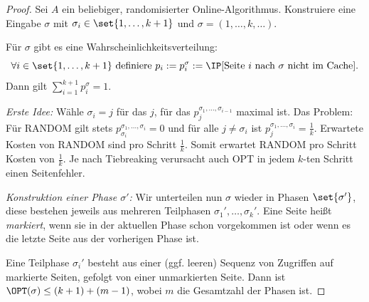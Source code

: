 \documentclass[language=ngerman,algolist]{TemplateLecture}
\begin{document}
\begin{proof}
    Sei $A$ ein beliebiger, randomisierter Online-Algorithmus. Konstruiere eine Eingabe $\sigma$ mit $\sigma_i \in \set{1, \ldots, k+1}$ und $\sigma = (1, \ldots, k, \ldots)$.

    Für $\sigma$ gibt es eine Wahrscheinlichkeitsverteilung:
    \begin{equation*}
        \forall i \in \set{1,\ldots,k+1} \text{ definiere } p_i := p_i^\sigma := \IP[\text{Seite $i$ nach $\sigma$ nicht im Cache}].
    \end{equation*}
    Dann gilt $\sum_{i = 1}^{k + 1} p_i^\sigma = 1$.

    \emph{Erste Idee:} Wähle $\sigma_i = j$ für das $j$, für das $p_j^{\sigma_1, \ldots, \sigma_{i-1}}$ maximal ist. Das Problem: Für RANDOM gilt stets $p^{\sigma_1, \ldots, \sigma_i}_{\sigma_i} = 0$ und für alle $j \neq \sigma_i$ ist $p^{\sigma_1, \ldots, \sigma_i}_j = \frac{1}{k}$. Erwartete Kosten von RANDOM sind pro Schritt $\frac{1}{k}$. Somit erwartet RANDOM pro Schritt Kosten von $\frac{1}{k}$. Je nach Tiebreaking verursacht auch OPT in jedem $k$-ten Schritt einen Seitenfehler.

    \emph{Konstruktion einer Phase $\sigma'$:} Wir unterteilen nun $\sigma$ wieder in Phasen $\set{\sigma'}$, diese bestehen jeweils aus mehreren Teilphasen $\sigma_1', \ldots, \sigma_k'$. Eine Seite heißt \emph{markiert}, wenn sie in der aktuellen Phase schon vorgekommen ist oder wenn es die letzte Seite aus der vorherigen Phase ist.

    Eine Teilphase $\sigma_i'$ besteht aus einer (ggf. leeren) Sequenz von Zugriffen auf markierte Seiten, gefolgt von einer unmarkierten Seite. Dann ist $\OPT(\sigma) \leq (k + 1) + (m - 1)$, wobei $m$ die Gesamtzahl der Phasen ist.


\end{proof}
\end{document}
